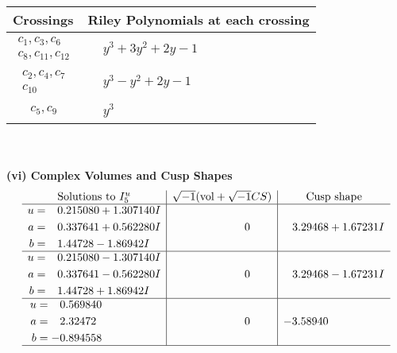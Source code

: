 \documentclass[1p]{elsarticle_modified}
\theoremstyle{definition}
\newcommand{\I}{\sqrt{-1}}
\begin{document}
\begin{tabular}{m{50pt}|m{274pt}}
Crossings & \hspace{64pt}Riley Polynomials at each crossing \\
\hline $$\begin{aligned}c_{1},c_{3},c_{6}\\c_{8},c_{11},c_{12}\end{aligned}$$&$\begin{aligned}
&y^3+3 y^2+2 y-1
\end{aligned}$\\
\hline $$\begin{aligned}c_{2},c_{4},c_{7}\\c_{10}\end{aligned}$$&$\begin{aligned}
&y^3- y^2+2 y-1
\end{aligned}$\\
\hline $$\begin{aligned}c_{5},c_{9}\end{aligned}$$&$\begin{aligned}
&y^3
\end{aligned}$\\
\hline
\end{tabular}\\~\\
\newpage\flushleft \textbf{(vi) Complex Volumes and Cusp Shapes}
$$\begin{array}{c|c|c}  
\text{Solutions to }I^u_{5}& \I (\text{vol} + \sqrt{-1}CS) & \text{Cusp shape}\\
 \hline 
\begin{aligned}
u &= \phantom{-}0.215080 + 1.307140 I \\
a &= \phantom{-}0.337641 + 0.562280 I \\
b &= \phantom{-}1.44728 - 1.86942 I\end{aligned}
 & \phantom{-0.000000 } 0 & \phantom{-}3.29468 + 1.67231 I \\ \hline\begin{aligned}
u &= \phantom{-}0.215080 - 1.307140 I \\
a &= \phantom{-}0.337641 - 0.562280 I \\
b &= \phantom{-}1.44728 + 1.86942 I\end{aligned}
 & \phantom{-0.000000 } 0 & \phantom{-}3.29468 - 1.67231 I \\ \hline\begin{aligned}
u &= \phantom{-}0.569840\phantom{ +0.000000I} \\
a &= \phantom{-}2.32472\phantom{ +0.000000I} \\
b &= -0.894558\phantom{ +0.000000I}\end{aligned}
 & \phantom{-0.000000 } 0 & -3.58940\phantom{ +0.000000I}\\
 \hline 
 \end{array}$$\newpage
\end{document}
